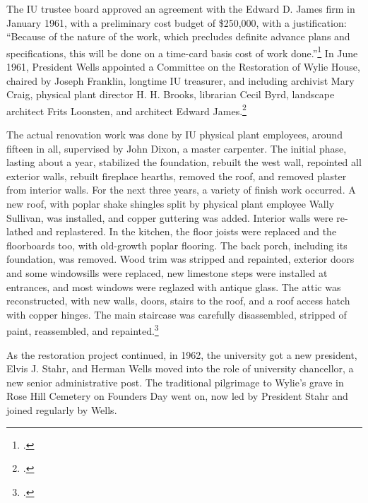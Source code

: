 \documentclass[
  american,
  letterpaper,
]{scrreprt}
\begin{document}
The IU trustee board approved an agreement with the Edward D. James firm
in January 1961, with a preliminary cost budget of \$250,000, with a
justification: ``Because of the nature of the work, which precludes
definite advance plans and specifications, this will be done on a
time-card basis cost of work done.''\footnote{.}
In June 1961, President Wells appointed a Committee on the Restoration
of Wylie House, chaired by Joseph Franklin, longtime IU treasurer, and
including archivist Mary Craig, physical plant director H. H. Brooks,
librarian Cecil Byrd, landscape architect Frits Loonsten, and architect
Edward James.\footnote{.}

The actual renovation work was done by IU physical plant employees,
around fifteen in all, supervised by John Dixon, a master carpenter. The
initial phase, lasting about a year, stabilized the foundation, rebuilt
the west wall, repointed all exterior walls, rebuilt fireplace hearths,
removed the roof, and removed plaster from interior walls. For the next
three years, a variety of finish work occurred. A new roof, with poplar
shake shingles split by physical plant employee Wally Sullivan, was
installed, and copper guttering was added. Interior walls were re-lathed
and replastered. In the kitchen, the floor joists were replaced and the
floorboards too, with old-growth poplar flooring. The back porch,
including its foundation, was removed. Wood trim was stripped and
repainted, exterior doors and some windowsills were replaced, new
limestone steps were installed at entrances, and most windows were
reglazed with antique glass. The attic was reconstructed, with new
walls, doors, stairs to the roof, and a roof access hatch with copper
hinges. The main staircase was carefully disassembled, stripped of
paint, reassembled, and repainted.\footnote{.}

As the restoration project continued, in 1962, the university got a new
president, Elvis J. Stahr, and Herman Wells moved into the role of
university chancellor, a new senior administrative post. The traditional
pilgrimage to Wylie's grave in Rose Hill Cemetery on Founders Day went
on, now led by President Stahr and joined regularly by Wells.
\end{document}
